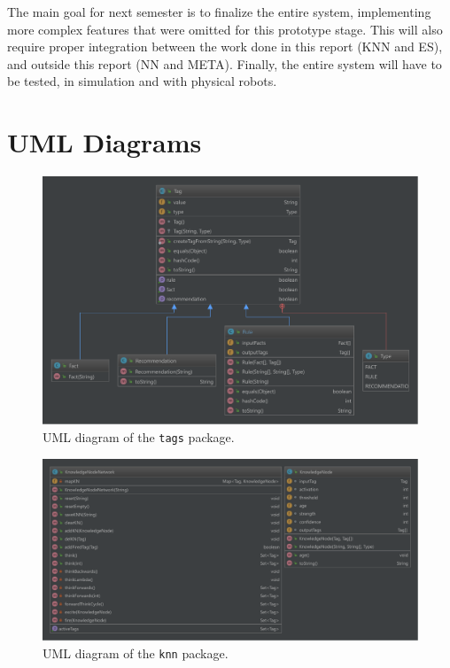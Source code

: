 \documentclass[titlepage,11pt]{article}
\newcommand{\code}[1]{\texttt{#1}}
\begin{document}
The main goal for next semester is to finalize the entire system, implementing more complex features that were omitted for this prototype stage. This will also require proper integration between the work done in this report (KNN and ES), and outside this report (NN and META). Finally, the entire system will have to be tested, in simulation and with physical robots.

\clearpage
\onecolumn
\appendix

\renewcommand\thefigure{\thesection.\arabic{figure}}
\setcounter{figure}{0}    

\section{UML Diagrams}
\label{sec:uml}

\begin{figure}[!htb]
	\centering
	\includegraphics[width=\columnwidth]{figures/uml_tags.pdf}
	\caption{UML diagram of the \code{tags} package.}
	\label{uml_tags}
\end{figure}

\begin{figure}[!htb]
	\centering
	\includegraphics[width=\columnwidth]{figures/uml_knn.pdf}
	\caption{UML diagram of the \code{knn} package.}
	\label{uml_knn}
\end{figure}
\end{document}
